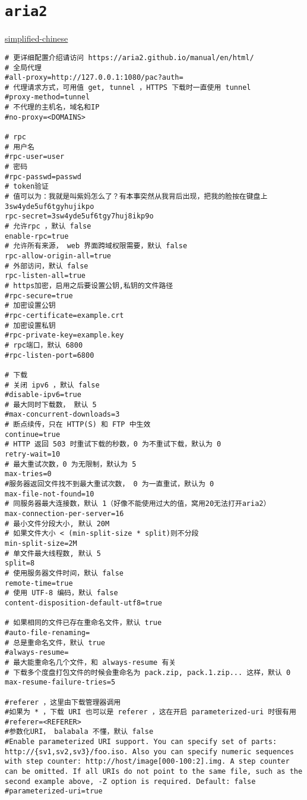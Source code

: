 \documentclass[11pt]{article}
\begin{document}
\section{\texttt{aria2}}
\label{sec:orgb284780}

\href{https://github.com/lilyvya/aria2-conf}{simplified-chinese}

\lstset{language=bash,label= ,caption= ,captionpos=b,numbers=none}
\begin{lstlisting}
# 更详细配置介绍请访问 https://aria2.github.io/manual/en/html/
# 全局代理
#all-proxy=http://127.0.0.1:1080/pac?auth=
# 代理请求方式，可用值 get, tunnel ，HTTPS 下载时一直使用 tunnel
#proxy-method=tunnel
# 不代理的主机名，域名和IP
#no-proxy=<DOMAINS>

# rpc
# 用户名
#rpc-user=user
# 密码
#rpc-passwd=passwd
# token验证
# 值可以为：我就是叫紫妈怎么了？有本事突然从我背后出现，把我的脸按在键盘上3sw4yde5uf6tgyhujikpo
rpc-secret=3sw4yde5uf6tgy7huj8ikp9o
# 允许rpc ，默认 false
enable-rpc=true
# 允许所有来源， web 界面跨域权限需要，默认 false
rpc-allow-origin-all=true
# 外部访问，默认 false
rpc-listen-all=true
# https加密，启用之后要设置公钥,私钥的文件路径
#rpc-secure=true
# 加密设置公钥
#rpc-certificate=example.crt
# 加密设置私钥
#rpc-private-key=example.key
# rpc端口，默认 6800
#rpc-listen-port=6800

# 下载
# 关闭 ipv6 ，默认 false
#disable-ipv6=true
# 最大同时下载数， 默认 5
#max-concurrent-downloads=3
# 断点续传，只在 HTTP(S) 和 FTP 中生效
continue=true
# HTTP 返回 503 时重试下载的秒数，0 为不重试下载，默认为 0
retry-wait=10
# 最大重试次数，0 为无限制，默认为 5
max-tries=0
#服务器返回文件找不到最大重试次数， 0 为一直重试，默认为 0
max-file-not-found=10
# 同服务器最大连接数，默认 1（好像不能使用过大的值，窝用20无法打开aria2）
max-connection-per-server=16
# 最小文件分段大小, 默认 20M
# 如果文件大小 < (min-split-size * split)则不分段
min-split-size=2M
# 单文件最大线程数, 默认 5
split=8
# 使用服务器文件时间，默认 false
remote-time=true
# 使用 UTF-8 编码，默认 false
content-disposition-default-utf8=true

# 如果相同的文件已存在重命名文件，默认 true
#auto-file-renaming=
# 总是重命名文件，默认 true
#always-resume=
# 最大能重命名几个文件，和 always-resume 有关
# 下载多个度盘打包文件的时候会重命名为 pack.zip, pack.1.zip... 这样，默认 0
max-resume-failure-tries=5

#referer ，这里由下载管理器调用
#如果为 * ，下载 URI 也可以是 referer ，这在开启 parameterized-uri 时很有用
#referer=<REFERER>
#参数化URI， balabala 不懂，默认 false
#Enable parameterized URI support. You can specify set of parts: http://{sv1,sv2,sv3}/foo.iso. Also you can specify numeric sequences with step counter: http://host/image[000-100:2].img. A step counter can be omitted. If all URIs do not point to the same file, such as the second example above, -Z option is required. Default: false
#parameterized-uri=true


\end{lstlisting}
\end{document}
